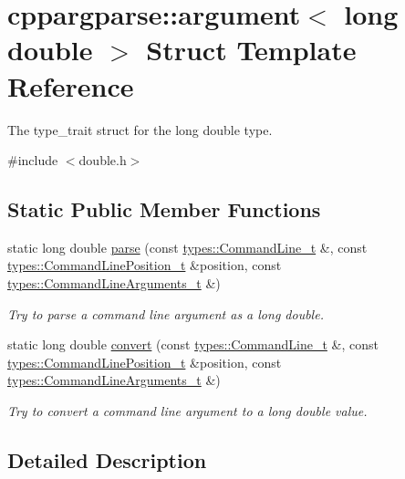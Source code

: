 \hypertarget{structcppargparse_1_1argument_3_01long_01double_01_4}{}\section{cppargparse\+:\+:argument$<$ long double $>$ Struct Template Reference}
\label{structcppargparse_1_1argument_3_01long_01double_01_4}


The type\+\_\+trait struct for the long double type.  




{\ttfamily \#include $<$double.\+h$>$}

\subsection*{Static Public Member Functions}
\begin{DoxyCompactItemize}
\item 
static long double \hyperlink{structcppargparse_1_1argument_3_01long_01double_01_4_a3030b59e675dcf51191cfc6e61bd6141}{parse} (const \hyperlink{types_8h_a80adf2418b7ce9fe616698efa7533ecf}{types\+::\+Command\+Line\+\_\+t} \&, const \hyperlink{types_8h_a43b4f43f8940de1bf09ced6f1b668053}{types\+::\+Command\+Line\+Position\+\_\+t} \&position, const \hyperlink{types_8h_a003c660afe2ee9c6cc39aea966e8926d}{types\+::\+Command\+Line\+Arguments\+\_\+t} \&)
\begin{DoxyCompactList}\small\item\em Try to parse a command line argument as a long double. \end{DoxyCompactList}\item 
static long double \hyperlink{structcppargparse_1_1argument_3_01long_01double_01_4_a9987289594effd9b0561188827010cb2}{convert} (const \hyperlink{types_8h_a80adf2418b7ce9fe616698efa7533ecf}{types\+::\+Command\+Line\+\_\+t} \&, const \hyperlink{types_8h_a43b4f43f8940de1bf09ced6f1b668053}{types\+::\+Command\+Line\+Position\+\_\+t} \&position, const \hyperlink{types_8h_a003c660afe2ee9c6cc39aea966e8926d}{types\+::\+Command\+Line\+Arguments\+\_\+t} \&)
\begin{DoxyCompactList}\small\item\em Try to convert a command line argument to a long double value. \end{DoxyCompactList}\end{DoxyCompactItemize}


\subsection{Detailed Description}
